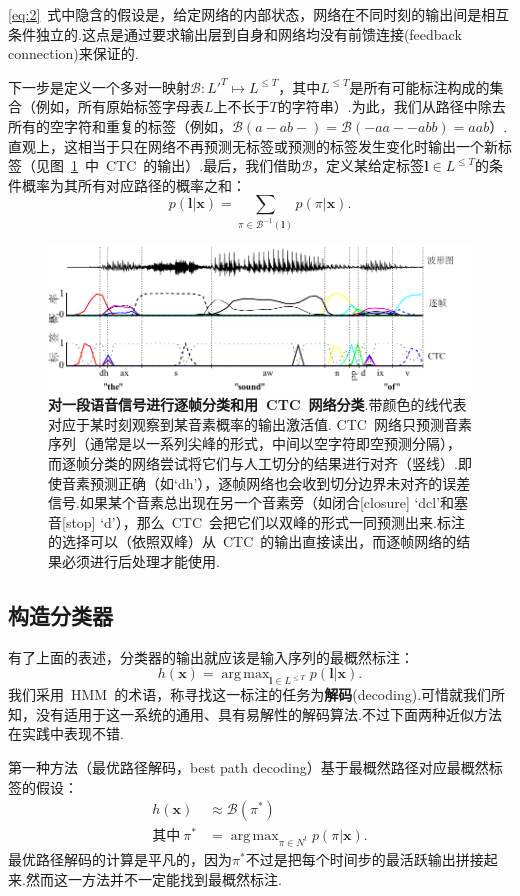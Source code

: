 \documentclass{ctexart}
\DeclareMathOperator*{\argmax}{arg\,max}
\def\cB{\mathcal{B}}
\def\vl{\mathbf{l}}
\def\vx{\mathbf{x}}
\begin{document}
\eqref{eq:2}~式中隐含的假设是，给定网络的内部状态，网络在不同时刻的输出间是相互条件独立的.这点是通过要求输出层到自身和网络均没有前馈连接(feedback connection)来保证的.

下一步是定义一个多对一映射$\cB: L'^T\mapsto L^{\le T}$，其中$L^{\le T}$是所有可能标注构成的集合（例如，所有原始标签字母表$L$上不长于$T$的字符串）.为此，我们从路径中除去所有的空字符和重复的标签（例如，$\cB(a-ab-)=\cB(-aa--abb)=aab$）.直观上，这相当于只在网络不再预测无标签或预测的标签发生变化时输出一个新标签（见图~\ref{fig:1}~中~CTC~的输出）.最后，我们借助$\cB$，定义某给定标签$\vl\in L^{\le T}$的条件概率为其所有对应路径的概率之和：
\begin{equation}
	\label{eq:3}
	p(\vl|\vx) = \sum_{\pi\in\cB^{-1}(\vl)}p(\pi|\vx).
\end{equation}
\begin{figure}
	\label{fig:1}
	\centering
	\includegraphics[width=\textwidth]{fig/1}
	\caption{\textbf{对一段语音信号进行逐帧分类和用~CTC~网络分类}.带颜色的线代表对应于某时刻观察到某音素概率的输出激活值. CTC~网络只预测音素序列（通常是以一系列尖峰的形式，中间以空字符即空预测分隔），而逐帧分类的网络尝试将它们与人工切分的结果进行对齐（竖线）.即使音素预测正确（如`dh'），逐帧网络也会收到切分边界未对齐的误差信号.如果某个音素总出现在另一个音素旁（如闭合[closure] `dcl'和塞音[stop] `d'），那么~CTC~会把它们以双峰的形式一同预测出来.标注的选择可以（依照双峰）从~CTC~的输出直接读出，而逐帧网络的结果必须进行后处理才能使用.}
\end{figure}
\subsection{构造分类器}
\label{sec:classifier}
有了上面的表述，分类器的输出就应该是输入序列的最概然标注：
\[h(\vx) = \argmax_{\vl\in L^{\le T}} p(\vl|\vx).\]
我们采用~HMM~的术语，称寻找这一标注的任务为\textbf{解码}(decoding).可惜就我们所知，没有适用于这一系统的通用、具有易解性的解码算法.不过下面两种近似方法在实践中表现不错.

第一种方法（最优路径解码，best path decoding）基于最概然路径对应最概然标签的假设：
\begin{equation}
	\begin{split}
		h(\vx) & \approx \cB(\pi^*)\\
		\text{其中}~\pi^* & = \argmax_{\pi\in N^t}p(\pi|\vx).
	\end{split}
\end{equation}
最优路径解码的计算是平凡的，因为$\pi^*$不过是把每个时间步的最活跃输出拼接起来.然而这一方法并不一定能找到最概然标注.
\end{document}
